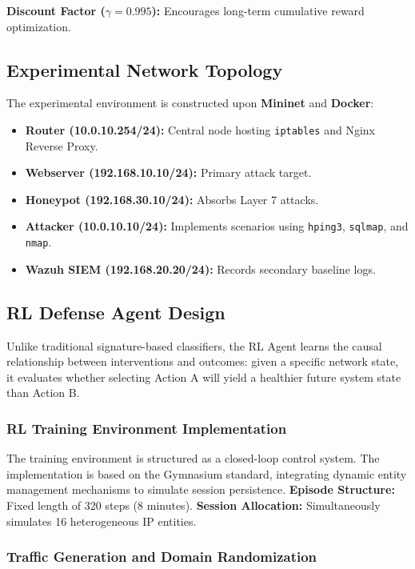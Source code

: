 \documentclass[12pt,a4paper]{report}
\begin{document}
\textbf{Discount Factor ($\gamma = 0.995$):} Encourages long-term cumulative reward optimization.

\subsection{Experimental Network Topology}

The experimental environment is constructed upon \textbf{Mininet} and \textbf{Docker}:
\begin{itemize}
    \item \textbf{Router (10.0.10.254/24):} Central node hosting \texttt{iptables} and Nginx Reverse Proxy.
    \item \textbf{Webserver (192.168.10.10/24):} Primary attack target.
    \item \textbf{Honeypot (192.168.30.10/24):} Absorbs Layer 7 attacks.
    \item \textbf{Attacker (10.0.10.10/24):} Implements scenarios using \texttt{hping3}, \texttt{sqlmap}, and \texttt{nmap}.
    \item \textbf{Wazuh SIEM (192.168.20.20/24):} Records secondary baseline logs.
\end{itemize}

\subsection{RL Defense Agent Design}

Unlike traditional signature-based classifiers, the RL Agent learns the causal relationship between interventions and outcomes: given a specific network state, it evaluates whether selecting Action A will yield a healthier future system state than Action B.

\subsubsection{RL Training Environment Implementation}

The training environment is structured as a closed-loop control system. The implementation is based on the Gymnasium standard, integrating dynamic entity management mechanisms to simulate session persistence.
\textbf{Episode Structure:} Fixed length of 320 steps (8 minutes).
\textbf{Session Allocation:} Simultaneously simulates 16 heterogeneous IP entities.

\subsubsection{Traffic Generation and Domain Randomization}
\end{document}

